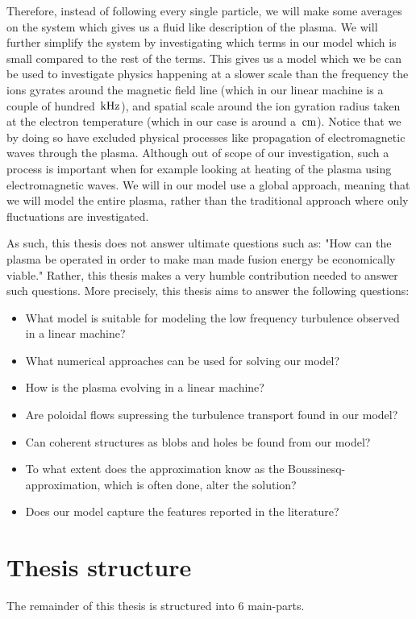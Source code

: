 Therefore, instead of following every single particle, we will make some averages on the system which gives us a fluid like description of the plasma.
We will further simplify the system by investigating which terms in our model which is small compared to the rest of the terms.
This gives us a model which we be can be used to investigate physics happening at a slower scale than the frequency the ions gyrates around the magnetic field line (which in our linear machine is a couple of hundred $\, \text{kHz}$), and spatial scale around the ion gyration radius taken at the electron temperature (which in our case is around a $\, \text{cm}$).
Notice that we by doing so have excluded physical processes like propagation of electromagnetic waves through the plasma.
Although out of scope of our investigation, such a process is important when for example looking at heating of the plasma using electromagnetic waves.
We will in our model use a global approach, meaning that we will model the entire plasma, rather than the traditional approach where only fluctuations are investigated.

As such, this thesis does not answer ultimate questions such as:
"How can the plasma be operated in order to make man made fusion energy be economically viable."
Rather, this thesis makes a very humble contribution needed to answer such questions.
More precisely, this thesis aims to answer the following questions:
%
\begin{itemize}[noitemsep]
    \item What model is suitable for modeling the low frequency turbulence observed in a linear machine?
    \item What numerical approaches can be used for solving our model?
    \item How is the plasma evolving in a linear machine?
    \item Are poloidal flows supressing the turbulence transport found in our model?
    \item Can coherent structures as blobs and holes be found from our model?
    \item To what extent does the approximation know as the Boussinesq-approximation, which is often done, alter the solution?
    \item Does our model capture the features reported in the literature?
\end{itemize}

\section{Thesis structure}
%
The remainder of this thesis is structured into $6$ main-parts.

